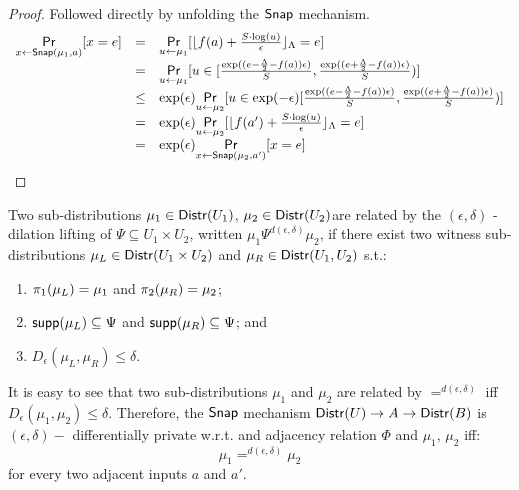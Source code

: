 \documentclass{article}
\begin{document}
\begin{proof}
Followed directly by unfolding the $\mathsf{Snap}$ mechanism.
\[
	\begin{array}{lll}
	\underset{x \leftarrow \mathsf{Snap}(\mu_1, a)}{\mathsf{Pr}}[x = e] 
	& = & \underset{u \leftarrow \mu_1}{\mathsf{Pr}}[	\lfloor 
				f(a) + \frac{ S \cdot \log(u)}{\epsilon} 
				\rfloor_{\Lambda} = e
			]\\
	& = & \underset{ u \leftarrow \mu_1}{\mathsf{Pr}}[ u \in [
		   		\frac{\exp((e - \frac{\Lambda}{2} - f(a)) \epsilon )}{S},
		   		\frac{\exp((e + \frac{\Lambda}{2} - f(a)) \epsilon )}{S})
		   	]\\
	& \leq & \exp(\epsilon)
			\underset{ u \leftarrow \mu_2}{\mathsf{Pr}}[ u \in \exp(-\epsilon)[
		   		\frac{\exp((e - \frac{\Lambda}{2} - f(a)) \epsilon )}{S},
		   		\frac{\exp((e + \frac{\Lambda}{2} - f(a)) \epsilon )}{S})
		   	]\\
	& = & \exp(\epsilon)
			\underset{u \leftarrow \mu_2}{\mathsf{Pr}}[	\lfloor 
				f(a') + \frac{ S \cdot \log(u)}{\epsilon} 
				\rfloor_{\Lambda} = e
			]\\
	& = & \exp(\epsilon)
			\underset{x \leftarrow \mathsf{Snap}(\mu_2, a')}{\mathsf{Pr}}[x = e] 
	\end{array}
\]
\end{proof}

\begin{defn}
Two sub-distributions $\mu_1 \in \mathsf{Distr}(U_1)$, $\mu_2 \in \mathsf{Distr}(U_2)$are related by the $(\epsilon, \delta)$ - dilation lifting of $\Psi \subseteq U_1 \times U_2$, written $\mu_1 \Psi^{d(\epsilon, \delta)} \mu_2$, if there exist two witness sub-distributions $\mu_L \in \mathsf{Distr}(U_1 \times U_2)$ and $\mu_R \in \mathsf{Distr}(U_1, U_2)$ s.t.:
\begin{enumerate}
	\item $\pi_1(\mu_L) = \mu_1$ and $\pi_2(\mu_R) = \mu_2$;
	\item $\mathsf{supp}(\mu_L) \subseteq \Psi$ and $\mathsf{supp}(\mu_R) \subseteq \Psi$; and
	\item $D_{\epsilon}(\mu_L, \mu_R) \leq \delta$.
\end{enumerate}
\end{defn}

It is easy to see that two sub-distributions $\mu_1$ and $\mu_2$ are related by $=^{d(\epsilon, \delta)}$ iff $D_{\epsilon}(\mu_1, \mu_2) \leq \delta$. Therefore, the $\mathsf{Snap}$ mechanism $\mathsf{Distr}(U) \to A \to \mathsf{Distr}(B)$ is $(\epsilon, \delta) - $ differentially private w.r.t. and adjacency relation $\Phi$ and $\mu_1$, $\mu_2$ iff:
\[
	\mu_1 =^{d(\epsilon, \delta)} \mu_2
\]
for every two adjacent inputs $a$ and $a'$.
\end{document}
